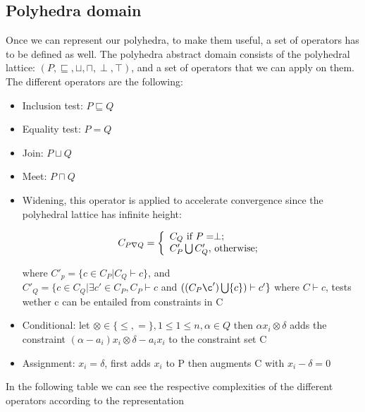 \subsection{Polyhedra domain}
Once we can represent our polyhedra, to make them useful, a set of operators has to be defined as well. The polyhedra abstract domain consists of the polyhedral lattice:
	$(P,\sqsubseteq,\sqcup,\sqcap,\perp,\top)$, and a set of operators that we can apply on them. The different operators are the following:
	\begin{itemize}
		\item Inclusion test: $P \sqsubseteq Q$
		\item Equality test: $P=Q$
		\item Join: $P\sqcup Q$
		\item Meet: $P\sqcap Q$
		\item Widening, this operator is applied to accelerate convergence since the polyhedral lattice has infinite height:
		\begin{center}
		  \[
    C_{P\nabla Q}=\left\{
                \begin{array}{ll}
                  C_Q $ if $P=\perp ;\\
                  C'_P\bigcup C'_Q, $ otherwise$;
                \end{array}
              \right.
  	\]
		
		\end{center}

		where $C'_p=\{c\in C_P |C_Q \vdash c \}$, and\\  $C'_Q=\{c\in C_Q |\exists c' \in C_P,C_P \vdash c $ and $((C_P\c')\bigcup \{c\})\vdash c' \}$
		where $C\vdash c$, tests wether c can be entailed from constraints in C
		\item Conditional: let $\otimes \in \{\leq,=\},1\leq 1\leq n,\alpha \in Q$ then $\alpha x_i \otimes \delta$ adds the constraint $(\alpha-a_i)x_i \otimes\delta - a_i x_i$ to the constraint set C
		\item Assignment: $x_i = \delta$, first adds $x_i$ to P then augments C with $x_i -\delta = 0$
		
	\end{itemize}
	 In the following table we can see the respective complexities of the different operators according to the representation
	 
